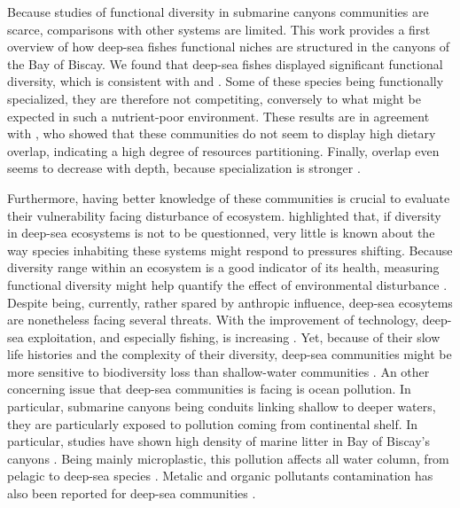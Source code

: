 
Because studies of functional diversity in submarine canyons communities are scarce, comparisons with other systems are limited. This work provides a first overview of how deep-sea fishes functional niches are structured in the canyons of the Bay of Biscay. We found that deep-sea fishes displayed significant functional diversity, which is consistent with \citet{aneeshkumar2017} and \citet{carrington2021}. Some of these species being functionally specialized, they are therefore not competiting, conversely to what might be expected in such a nutrient-poor environment. These results are in agreement with \citet{preciado2017}, who showed that these communities do not seem to display high dietary overlap, indicating a high degree of resources partitioning. Finally, overlap even seems to decrease with depth, because specialization is stronger \citep{carrasson2002,farre2016}. 

Furthermore, having better knowledge of these communities is crucial to evaluate their vulnerability facing disturbance of ecosystem. \citet{carrington2021} highlighted that, if diversity in deep-sea ecosystems is not to be questionned, very little is known about the way species inhabiting these systems might respond to pressures shifting. Because diversity range within an ecosystem is a good indicator of its health, measuring functional diversity might help quantify the effect of environmental disturbance \citet{carrington2021,villeger2017}. Despite being, currently, rather spared by anthropic influence, deep-sea ecosytems are nonetheless facing several threats. With the improvement of technology, deep-sea exploitation, and especially fishing, is increasing \citep{carrington2021}. Yet, because of their slow life histories and the complexity of their diversity, deep-sea communities might be more sensitive to biodiversity loss than shallow-water communities \citep{carrington2021,danovaro2017}. An other concerning issue that deep-sea communities is facing is ocean pollution. In particular, submarine canyons being conduits linking shallow to deeper waters, they are particularly exposed to pollution coming from continental shelf. In particular, studies have shown high density of marine litter in Bay of Biscay's canyons \citep{vandenbeld2017}. Being mainly microplastic, this pollution affects all water column, from pelagic to deep-sea species \citep{pereira2020}. Metalic and organic pollutants contamination has also been reported for deep-sea communities \citep{spitz2019}.

